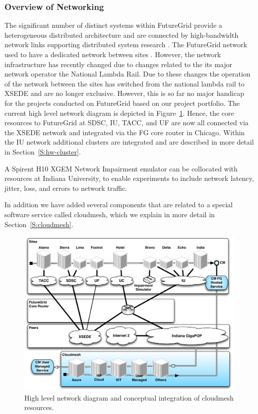 \documentclass{article}
\begin{document}




\subsubsection{Overview of Networking}

The significant number of distinct systems within FutureGrid provide a heterogeneous distributed architecture and are connected by high-bandwidth network links supporting distributed system research \cite{las12fg-bookchapter}. The FutureGrid network used to have a dedicated network between sites \cite{las12fg-bookchapter}. However, the network infrastructure has recently changed due to changes related to the its major network operator the National Lambda Rail.  Due to these changes the operation of the network between the sites has switched from the national lambda rail to XSEDE and are no longer exclusive. However, this is so far no major handicap for the projects conducted on FutureGrid based on our project portfolio.  The current high level network diagram is depicted in Figure~\ref{F:network}. Hence, the core resources to FutureGrid at SDSC, IU, TACC, and UF are now all connected via the XSEDE network and integrated via the FG core router in Chicago. Within the IU network additional clusters are integrated and are described in more detail in Section~\ref{S:hw-cluster}.

A Spirent H10 XGEM Network Impairment emulator \cite{www-network-impairment} can be collocated with resources at Indiana University, to enable experiments to include network latency, jitter, loss, and errors to network traffic. 

In addition we have added several components that are related to a special software service called cloudmesh, which we explain in more detail in Section~\ref{S:cloudmesh}. 

\begin{figure}[htb]
  \centering
    \includegraphics[width=1.0\textwidth]{images/fg-network-2014-cm.pdf}
  \caption{High level network diagram and conceptual integration of cloudmesh resources.}
\label{F:network}
\end{figure}
\end{document}
